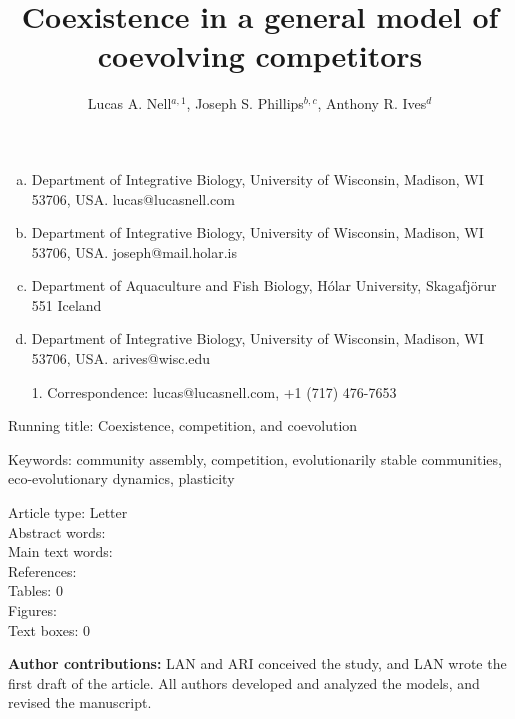 \documentclass[12pt]{article}
\title{Coexistence in a general model of coevolving competitors}
\author{Lucas A. Nell$^{a,1}$,
Joseph S. Phillips$^{b,c}$,
Anthony R. Ives$^{d}$}
\date{}
\begin{document}
\singlespacing
\linenumbers{}
\modulolinenumbers[1]

\maketitle
\author{}

\raggedright
\setlength{\parskip}{1em}


\begin{enumerate}[a.]
\item
Department of Integrative Biology, University of Wisconsin, Madison, WI 53706, USA. lucas@lucasnell.com
\item
Department of Integrative Biology, University of Wisconsin, Madison, WI 53706, USA. joseph@mail.holar.is
\item
Department of Aquaculture and Fish Biology, H\'{o}lar University, Skagafj\"{o}r{\dh}ur 551 Iceland
\item 
Department of Integrative Biology, University of Wisconsin, Madison, WI 53706, USA. arives@wisc.edu \\[1ex]
\item[1.]
Correspondence: lucas@lucasnell.com, +1 (717) 476-7653
\end{enumerate}




\noindent Running title: Coexistence, competition, and coevolution

\noindent Keywords: {
community assembly,
competition,
evolutionarily stable communities,
eco-evolutionary dynamics,
plasticity}

\bigskip

\noindent Article type: Letter \\
\noindent Abstract words:  \\
\noindent Main text words:  \\ %
\noindent References: \\
\noindent Tables: 0 \\
\noindent Figures:  \\
\noindent Text boxes: 0 \\


\bigskip


\textbf{Author contributions:} LAN and ARI conceived the study,
and LAN wrote the first draft of the article.
All authors developed and analyzed the models, and revised the manuscript.
\end{document}
